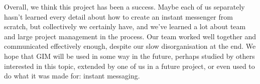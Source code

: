 Overall, we think this project has been a success. Maybe each of us separately hasn't learned every detail about how to create an instant messenger from scratch, but collectively we certainly have, and we've learned a lot about team and large project management in the process. Our team worked well together and communicated effectively enough, despite our slow disorganisation at the end. We hope that GIM will be used in some way in the future, perhaps studied by others interested in this topic, extended by one of us in a future project, or even used to do what it was made for: instant messaging.

